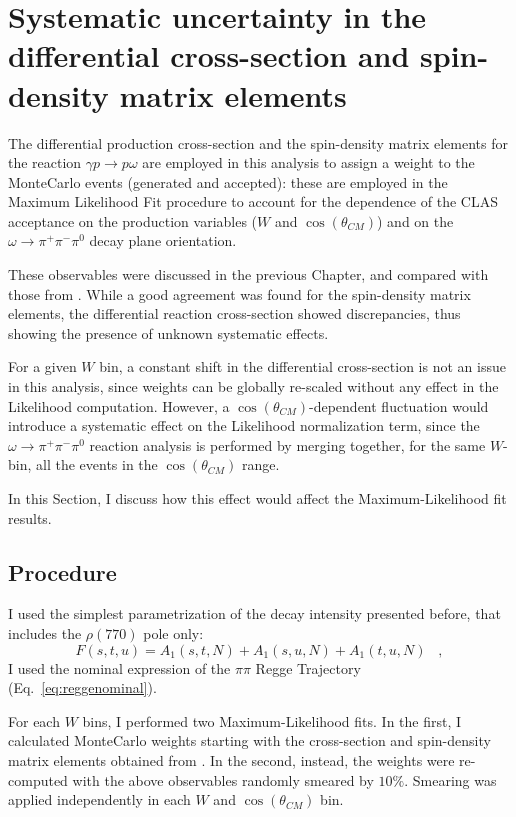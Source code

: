 \documentclass[a4paper,10pt]{report}
\newcommand{\decay}{$\omega \rightarrow \pi^+ \pi^- \pi^0$ }
\newcommand{\production}{$\gamma p \rightarrow p \omega$ }
\begin{document}
\section{Systematic uncertainty in the differential cross-section and spin-density matrix elements}

The differential production cross-section and the spin-density matrix elements for the reaction \production are employed in this analysis to assign a weight to the MonteCarlo events (generated and accepted): these are employed in the Maximum Likelihood Fit procedure to account
for the dependence of the CLAS acceptance on the production variables ($W$ and $\cos(\theta_{CM})$) and on the \decay decay plane orientation. 

These observables were discussed in the previous Chapter, and compared with those from \cite{Williams:2009ab}. While a good agreement was found for the spin-density matrix elements, the differential reaction cross-section showed discrepancies, thus showing the presence of
unknown systematic effects.

For a given $W$ bin, a constant shift in the differential cross-section is not an issue in this analysis, since weights can be globally re-scaled without any effect in the Likelihood computation. 
However, a $\cos(\theta_{CM})$-dependent fluctuation would introduce a systematic effect on the Likelihood normalization term, since the \decay reaction analysis is performed by merging together, for the same $W$-bin, all the events in the $\cos(\theta_{CM})$ range.

In this Section, I discuss how this effect would affect the Maximum-Likelihood fit results.

\subsection{Procedure}

I used the simplest parametrization of the decay intensity presented before, that includes the $\rho(770)$ pole only:
\begin{equation}
F(s,t,u)=A_1(s,t,N)+A_1(s,u,N)+A_1(t,u,N) \; \; \; ,
\end{equation}
I used the nominal expression of the $\pi \pi$ Regge Trajectory (Eq.~\ref{eq:reggenominal}).

For each $W$ bins, I performed two Maximum-Likelihood fits. In the first, I calculated MonteCarlo weights starting with the cross-section and spin-density matrix elements obtained from \cite{Williams:2009ab}.
In the second, instead, the weights were re-computed with the above observables randomly smeared by $10\%$. Smearing was applied independently in each $W$ and $\cos(\theta_{CM})$ bin.
\end{document}
